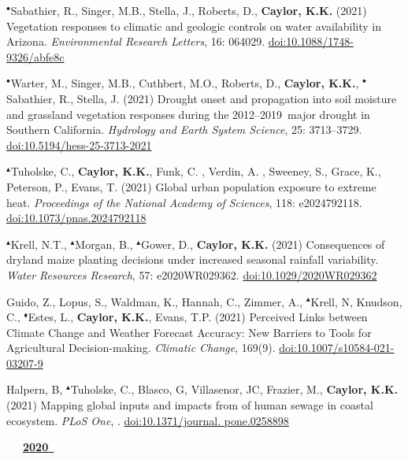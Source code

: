 \begin{etaremune}
\item $^{\bullet}$Sabathier, R., Singer, M.B., Stella, J., Roberts, D., \textbf{ Caylor, K.K.} (2021) Vegetation responses to climatic and geologic controls on water availability in Arizona. \emph{Environmental Research Letters}, 16: 064029. \href{https://doi.org/10.1088/1748-9326/abfe8c}{doi:10.1088/1748-9326/abfe8c}
\item $^{\bullet}$Warter, M., Singer, M.B., Cuthbert, M.O., Roberts, D., \textbf{ Caylor, K.K.}, $^{\bullet}$Sabathier, R., Stella, J. (2021) Drought onset and propagation into soil moisture and grassland vegetation responses during the 2012–2019 major drought in Southern California. \emph{Hydrology and Earth System Science}, 25: 3713–3729. \href{https://doi.org/10.5194/hess-25-3713-2021}{doi:10.5194/hess-25-3713-2021}
\item $^{\blacktriangle}$Tuholske, C., \textbf{ Caylor, K.K.}, Funk, C. , Verdin, A. , Sweeney, S., Grace, K., Peterson, P., Evans, T. (2021) Global urban population exposure to extreme heat. \emph{Proceedings of the National Academy of Sciences}, 118: e2024792118. \href{https://doi.org/10.1073/pnas.2024792118}{doi:10.1073/pnas.2024792118}
\item $^{\blacktriangle}$Krell, N.T., $^{\blacktriangle}$Morgan, B., $^{\blacktriangle}$Gower, D., \textbf{ Caylor, K.K.} (2021) Consequences of dryland maize planting decisions under increased seasonal rainfall variability. \emph{Water Resources Research}, 57: e2020WR029362. \href{https://doi.org/10.1029/2020WR029362}{doi:10.1029/2020WR029362}
\item Guido, Z., Lopus, S., Waldman, K., Hannah, C., Zimmer, A., $^{\blacktriangle}$Krell, N, Knudson, C., $^{\blacklozenge}$Estes, L., \textbf{ Caylor, K.K.}, Evans, T.P. (2021) Perceived Links between Climate Change and Weather Forecast Accuracy: New Barriers to Tools for Agricultural Decision-making. \emph{Climatic Change}, 169(9). \href{https://doi.org/10.1007/s10584-021-03207-9}{doi:10.1007/s10584-021-03207-9}
\item Halpern, B, $^{\blacktriangle}$Tuholske, C., Blasco, G, Villasenor, JC, Frazier, M., \textbf{ Caylor, K.K.} (2021) Mapping global inputs and impacts from of human sewage in coastal ecosystem. \emph{PLoS One}, . \href{https://doi.org/10.1371/journal. pone.0258898}{doi:10.1371/journal. pone.0258898}

\vspace{0.1in}
\mbox{\ \ \ \underline{\textbf{2020 }}}
\vspace{0.1in}


\end{etaremune}

